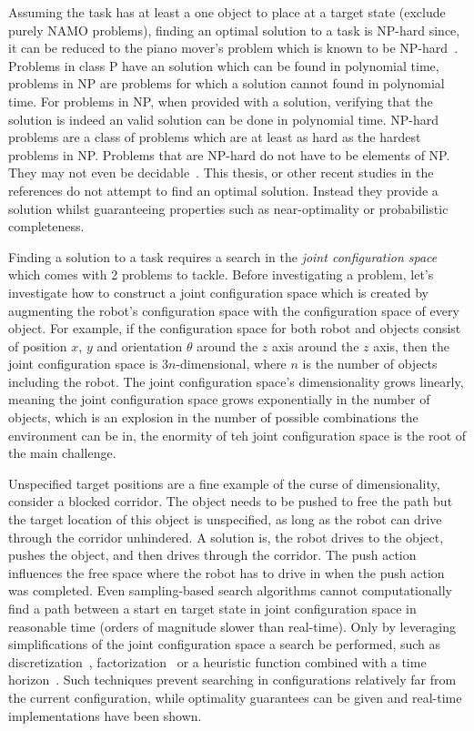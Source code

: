 Assuming the task has at least a one object to place at a target state (exclude purely \ac{NAMO} problems), finding an optimal solution to a task is \ac{NP-hard} since, it can be reduced to the piano mover's problem which is known to be \ac{NP-hard}~\cite{reif_motion_1985}.\\Problems in class P have an solution which can be found in polynomial time, problems in \ac{NP} are problems for which a solution cannot found in polynomial time. For problems in \ac{NP}, when provided with a solution, verifying that the solution is indeed an valid solution can be done in polynomial time. \ac{NP-hard} problems are a class of problems which are at least as hard as the hardest problems in \ac{NP}. Problems that are \ac{NP-hard} do not have to be elements of NP. They may not even be decidable~\cite{pokharel_computational_2020}. This thesis, or other recent studies in the references do not attempt to find an optimal solution. Instead they provide a solution whilst guaranteeing properties such as near-optimality or probabilistic completeness.\bs

Finding a solution to a task requires a search in the \textit{joint configuration space} which comes with 2 problems to tackle. Before investigating a problem, let's investigate how to construct a joint configuration space which is created by augmenting the robot's configuration space with the configuration space of every object. For example, if the configuration space for both robot and objects consist of position $x$, $y$ and orientation $\theta$ around the $z$ axis around the $z$ axis, then the joint configuration space is $3n$-dimensional, where $n$ is the number of objects including the robot. The joint configuration space's dimensionality grows linearly, meaning the joint configuration space grows exponentially in the number of objects, which is an explosion in the number of possible combinations the environment can be in, the enormity of teh joint configuration space is the root of the main challenge.\bs

Unspecified target positions are a fine example of the curse of dimensionality, consider a blocked corridor. The object needs to be pushed to free the path but the target location of this object is unspecified, as long as the robot can drive through the corridor unhindered. A solution is, the robot drives to the object, pushes the object, and then drives through the corridor. The push action influences the free space where the robot has to drive in when the push action was completed. Even sampling-based search algorithms cannot computationally find a path between a start en target state in joint configuration space in reasonable time (orders of magnitude slower than real-time). Only by leveraging simplifications of the joint configuration space a search be performed, such as discretization~\cite{sabbaghnovin_optimal_2016}, factorization~\cite{vega-brown_asymptotically_2020} or a heuristic function combined with a time horizon~\cite{sabbaghnovin_optimal_2016}. Such techniques prevent searching in configurations relatively far from the current configuration, while optimality guarantees can be given and real-time implementations have been shown.\bs

